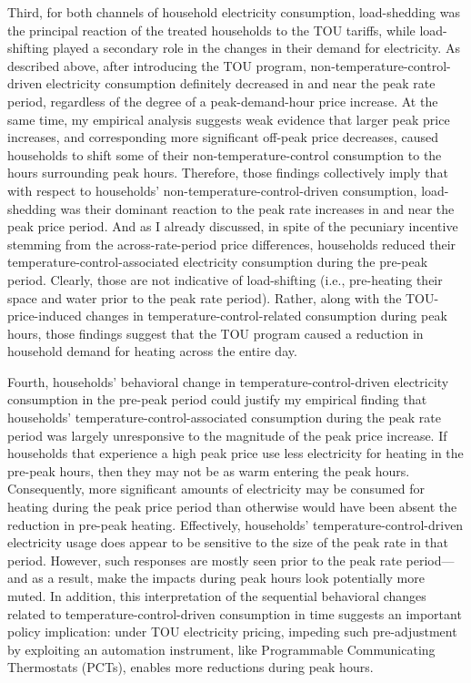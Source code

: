 Third, for both channels of household electricity consumption, load-shedding was the principal reaction of the treated households to the TOU tariffs, while load-shifting played a secondary role in the changes in their demand for electricity. As described above, after introducing the TOU program, non-temperature-control-driven electricity consumption definitely decreased in and near the peak rate period, regardless of the degree of a peak-demand-hour price increase. At the same time, my empirical analysis suggests weak evidence that larger peak price increases, and corresponding more significant off-peak price decreases, caused households to shift some of their non-temperature-control consumption to the hours surrounding peak hours. Therefore, those findings collectively imply that with respect to households' non-temperature-control-driven consumption, load-shedding was their dominant reaction to the peak rate increases in and near the peak price period. And as I already discussed, in spite of the pecuniary incentive stemming from the across-rate-period price differences, households reduced their temperature-control-associated electricity consumption during the pre-peak period. Clearly, those are not indicative of load-shifting (i.e., pre-heating their space and water prior to the peak rate period). Rather, along with the TOU-price-induced changes in temperature-control-related consumption during peak hours, those findings suggest that the TOU program caused a reduction in household demand for heating across the entire day.

Fourth, households' behavioral change in temperature-control-driven electricity consumption in the pre-peak period could justify my empirical finding that households' temperature-control-associated consumption during the peak rate period was largely unresponsive to the magnitude of the peak price increase. If households that experience a high peak price use less electricity for heating in the pre-peak hours, then they may not be as warm entering the peak hours. Consequently, more significant amounts of electricity may be consumed for heating during the peak price period than otherwise would have been absent the reduction in pre-peak heating. Effectively, households' temperature-control-driven electricity usage does appear to be sensitive to the size of the peak rate in that period. However, such responses are mostly seen prior to the peak rate period---and as a result, make the impacts during peak hours look potentially more muted. In addition, this interpretation of the sequential behavioral changes related to temperature-control-driven consumption in time suggests an important policy implication: under TOU electricity pricing, impeding such pre-adjustment by exploiting an automation instrument, like Programmable Communicating Thermostats (PCTs), enables more reductions during peak hours.

